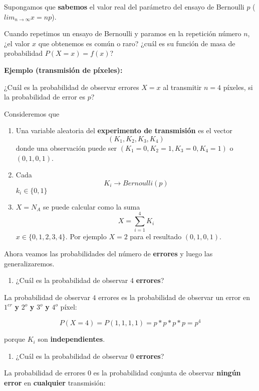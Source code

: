 \documentclass[
]{book}
\providecommand{\tightlist}{%
  \setlength{\itemsep}{0pt}\setlength{\parskip}{0pt}}
\begin{document}
Supongamos que \textbf{sabemos} el valor real del parámetro del ensayo de Bernoulli \(p\) (\(lim_{n\rightarrow \infty} x=np\)).

Cuando repetimos un ensayo de Bernoulli y paramos en la repetición número \(n\), ¿el valor \(x\) que obtenemos es común o raro? ¿cuál es su función de masa de probabilidad \(P(X=x)=f(x)\)?

\textbf{Ejemplo (transmisión de píxeles):}

¿Cuál es la probabilidad de observar errores \(X=x\) al transmitir \(n=4\) píxeles, si la probabilidad de error es \(p\)?

Consideremos que

\begin{enumerate}
\def\labelenumi{\arabic{enumi})}
\item
  Una variable aleatoria del \textbf{experimento de transmisión} es el vector \[(K_1, K_2, K_3, K_4)\] donde una observación puede ser \((K_1=0, K_2=1, K_3=0, K_4= 1)\) o \((0, 1, 0, 1)\).
\item
  Cada \[K_i \rightarrow Bernoulli(p)\] \(k_i \in \{0, 1\}\)
\item
  \(X=N_A\) se puede calcular como la suma \[X=\sum_{i=1}^4 K_i\] \(x\in \{0,1,2,3,4\}\). Por ejemplo \(X=2\) para el resultado \((0, 1, 0, 1)\).
\end{enumerate}

Ahora veamos las probabilidades del número de \textbf{errores} y luego las generalizaremos.

\begin{enumerate}
\def\labelenumi{\arabic{enumi})}
\tightlist
\item
  ¿Cuál es la probabilidad de observar \(4\) \textbf{errores}?
\end{enumerate}

La probabilidad de observar \(4\) errores es la probabilidad de observar un error en \(1^{er}\) \textbf{y} \(2^{o}\) \textbf{y} \(3^{o}\) \textbf{y} \(4 ^{o}\) píxel:

\[P(X=4)=P(1,1,1,1)=p*p*p*p=p^4\]

porque \(K_i\) son \textbf{independientes}.

\begin{enumerate}
\def\labelenumi{\arabic{enumi})}
\setcounter{enumi}{1}
\tightlist
\item
  ¿Cuál es la probabilidad de observar \(0\) \textbf{errores}?
\end{enumerate}

La probabilidad de errores \(0\) es la probabilidad conjunta de observar \textbf{ningún error} en \textbf{cualquier} transmisión:
\end{document}
